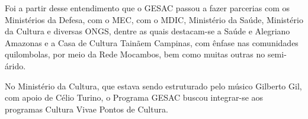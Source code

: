 \documentclass[
12pt,		%
openright,	%
twoside,  %
a4paper,			%
chapter=TITLE,		%
english,			%
french,				%
spanish,			%
brazil				%
]{USPSC-classe/USPSC}
\begin{document}
Foi a partir desse entendimento que o GESAC passou a fazer parcerias com os Minist\'erios da Defesa, com o MEC, com o MDIC,  Minist\'erio da Sa\'ude, Minist\'erio da Cultura e diversas ONGS, dentre as quais destacam-se a \textquotedbl Sa\'ude e Alegria\textquotedbl   no Amazonas e a \textquotedbl Casa de Cultura Tain\~a\textquotedbl  em Campinas, com \^enfase nas comunidades quilombolas, por meio da Rede Mocambos, bem como muitas outras no semi-\'arido.


















\noindent\begin{center}\mbox{\centering{}}\end{center}


No Minist\'erio da Cultura, que estava sendo estruturado pelo m\'usico Gilberto Gil, com apoio de C\'elio Turino, o Programa GESAC buscou integrar-se aos programas \textquotedbl Cultura Viva\textquotedbl  e \textquotedbl Pontos de Cultura\textquotedbl .
\end{document}
